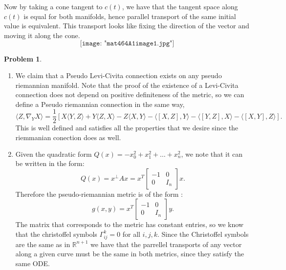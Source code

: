 \documentclass[12pt, a4paper]{article}
\newtheorem{problem}{Problem}
\theoremstyle{definition}
\newcommand{\penum}{ \begin{enumerate}[label=\bf(\alph*), leftmargin=0pt]}
\newcommand{\epenum}{ \end{enumerate} }
\newcommand{\R}{\mathbb{R}}                           %
\newcommand{\lan}{\langle}
\newcommand{\ran}{\rangle}
\newcommand{\inn}[1]{\lan#1\ran}
\newcommand{\bmat}[1]{\begin{bmatrix}#1\end{bmatrix}}
\begin{document}
Now by taking a cone tangent to $c(t)$, we have that the tangent space along $c(t)$ is equal for both manifolds, hence parallel transport of the same initial value is equivalent. This transport looks like fixing the direction of the vector and moving it along the cone. 
$$\texttt{[image: "mat464A1image1.jpg"]}$$
\newpage 
\begin{problem}
\end{problem}
\penum
\item We claim that a Pseudo Levi-Civita connection exists on any pseudo riemannian manifold. 
Note that the proof of the existence of a Levi-Civita connection does not depend on positive definiteness of the metric, so we can define a Pseudo riemannian connection in the same way, 
$$\inn{Z, \nabla_Y X } = \frac{1}{2} \left[ X\inn{Y,Z} + Y \inn{Z,X} - Z\inn{X,Y} -  \inn{[X,Z], Y} - \inn{[Y,Z], X} - \inn{[X,Y], Z}\right].$$
This is well defined and satisfies all the properties that we desire since the riemmanian conection does as well. 
\item Given the quadratic form $Q(x) = -x_0^2 + x_1^2 +  \dots + x_n^2$, we note that it can be written in the form: 
	$$Q(x) = x^\perp A x = x^T \bmat{-1 & 0 \\ 0 & I_n} x.$$
	Therefore the pseudo-riemannian metric is of the form : $$g(x,y) = x^T \bmat{-1 & 0 \\ 0 & I_n} y.$$
The matrix that corresponds to the metric has constant entries, so we know that the christoffel symbols $\Gamma_{ij}^k =0$ for all $i,j,k$. Since the Christoffel symbols are the same as in $\R^{n+1}$ we have that the parrellel transports of any vector along a given curve must be the same in both metrics, since they satisfy the same ODE. 
\epenum
\end{document}
